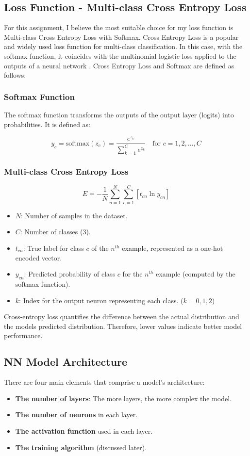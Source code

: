 \documentclass[conference]{IEEEtran}
\begin{document}
\subsection{Loss Function - Multi-class Cross Entropy Loss}
For this assignment, I believe the most suitable choice for my loss function is Multi-class Cross Entropy Loss with Softmax. Cross Entropy Loss is a popular and widely used loss function for multi-class classification. In this case, with the softmax function, it coincides with the multinomial logistic loss applied to the outputs of a neural network \cite{pmlr-v202-mao23b}. Cross Entropy Loss and Softmax are defined as follows:
\newline \\
\subsubsection*{Softmax Function}
The softmax function transforms the outputs of the output layer (logits) into probabilities. It is defined as:

\[
y_c = \text{softmax}(z_c) = \frac{e^{z_c}}{\sum_{k=1}^{C} e^{z_k}} \quad \text{for } c = 1, 2, \ldots, C
\]
\newline
\subsubsection*{Multi-class Cross Entropy Loss}
\[
E = -\frac{1}{N} \sum_{n=1}^{N} \sum_{c=1}^{C} \left[ t_{cn} \ln y_{cn} \right]
\]

\begin{itemize}
    \item $N$: Number of samples in the dataset.
    \item $C$: Number of classes ($3$).
    \item $t_{cn}$: True label for class $c$ of the $n^{th}$ example, represented as a one-hot encoded vector.
    \item $y_{cn}$: Predicted probability of class $c$ for the $ n^{th}$ example (computed by the softmax function).
    \item $k$: Index for the output neuron representing each class. ($k = 0,1,2$)\\
\end{itemize}
Cross-entropy loss quantifies the difference between the actual distribution and the models predicted distribution. Therefore, lower values indicate better model performance.

\subsection{NN Model Architecture}
There are four main elements that comprise a model's architecture:
\begin{itemize}
    \item \textbf{The number of layers}: The more layers, the more complex the model.
    \item \textbf{The number of neurons} in each layer.
    \item \textbf{The activation function} used in each layer.
    \item \textbf{The training algorithm} (discussed later).
\end{itemize}
\end{document}
